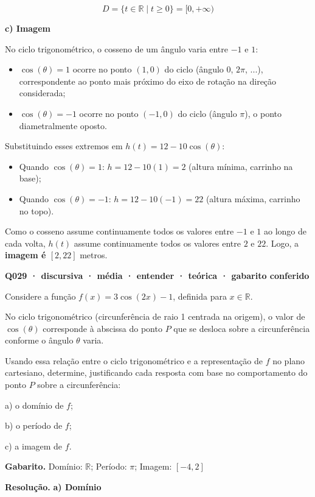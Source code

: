 \documentclass[11pt,a4paper]{article}
\begin{document}
$$D = \{t \in \mathbb{R} \mid t \ge 0\} = [0, +\infty)$$

\textbf{c) Imagem}

No ciclo trigonométrico, o cosseno de um ângulo varia entre $-1$ e $1$:
\begin{itemize}[nosep,leftmargin=*]
\item $\cos(\theta) = 1$ ocorre no ponto $(1,0)$ do ciclo (ângulo $0$, $2\pi$, ...), correspondente ao ponto mais próximo do eixo de rotação na direção considerada;
\item $\cos(\theta) = -1$ ocorre no ponto $(-1,0)$ do ciclo (ângulo $\pi$), o ponto diametralmente oposto.
\end{itemize}

Substituindo esses extremos em $h(t) = 12 - 10\cos(\theta)$:

\begin{itemize}[nosep,leftmargin=*]
\item Quando $\cos(\theta) = 1$: $h = 12 - 10(1) = 2$ (altura mínima, carrinho na base);
\item Quando $\cos(\theta) = -1$: $h = 12 - 10(-1) = 22$ (altura máxima, carrinho no topo).
\end{itemize}

Como o cosseno assume continuamente todos os valores entre $-1$ e $1$ ao longo de cada volta, $h(t)$ assume continuamente todos os valores entre $2$ e $22$. Logo, a \textbf{imagem é $[2, 22]$} metros.

\bigskip\noindent\textbf{Q029 · discursiva · média · entender · teórica · gabarito conferido}\par\nopagebreak
Considere a função $f(x) = 3\cos(2x) - 1$, definida para $x \in \mathbb{R}$.

No ciclo trigonométrico (circunferência de raio 1 centrada na origem), o valor de $\cos(\theta)$ corresponde à abscissa do ponto $P$ que se desloca sobre a circunferência conforme o ângulo $\theta$ varia.

Usando essa relação entre o ciclo trigonométrico e a representação de $f$ no plano cartesiano, determine, justificando cada resposta com base no comportamento do ponto $P$ sobre a circunferência:

a) o domínio de $f$;

b) o período de $f$;

c) a imagem de $f$.

\textbf{Gabarito.} Domínio: $\mathbb{R}$; Período: $\pi$; Imagem: $[-4, 2]$

\textbf{Resolução.} \textbf{a) Domínio}
\end{document}
